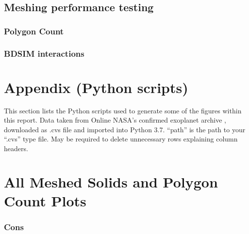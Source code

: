 \documentclass[12pt,a4paper]{article}
\begin{document}
\subsection{Meshing performance testing}
\subsubsection{Polygon Count}
\subsubsection{BDSIM interactions}


 
\newpage

%
%




\newpage
\appendix

\section{Appendix (Python scripts)}
This section lists the Python scripts used to generate some of the figures within this report.
Data taken from Online NASA's confirmed exoplanet archive \cite{arch}, downloaded as .cvs file and imported into Python 3.7. ``path'' is the path to your ``.cvs'' type file. May be required to delete unnecessary rows explaining column headers.

\section{All Meshed Solids and Polygon Count Plots}
\subsubsection{Cons}
\end{document}
